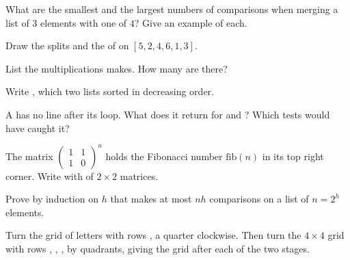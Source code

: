 \begin{exercise}[$\star$]\label{exo:g12:divide-and-conquer:2}
What are the smallest and the largest numbers of comparisons when merging a list of $3$ elements with one of $4$?
Give an example of each.
\end{exercise}

\begin{exercise}[$\star$]\label{exo:g12:divide-and-conquer:3}
Draw the splits and the  of  on $[5, 2, 4, 6, 1, 3]$.
\end{exercise}

\begin{exercise}[$\star$]\label{exo:g12:divide-and-conquer:4}
List the multiplications  makes. How many are there?
\end{exercise}

\begin{exercise}[$\star$]\label{exo:g12:divide-and-conquer:5}
Write , which  two lists sorted in decreasing order.
\end{exercise}

\begin{exercise}[$\star\star$]\label{exo:g12:divide-and-conquer:6}
A  has no line after its loop. What does it return for \code{[1, 4, 9]} and \code{[2, 3]}? Which tests
would have caught it?
\end{exercise}

\begin{exercise}[$\star\star$]\label{exo:g12:divide-and-conquer:7}
The matrix $\begin{pmatrix} 1 & 1 \\ 1 & 0 \end{pmatrix}^n$ holds the Fibonacci number $\mathrm{fib}(n)$ in its top
right corner. Write  with  of $2 \times 2$ matrices.
\end{exercise}

\begin{exercise}[$\star\star$]\label{exo:g12:divide-and-conquer:8}
Prove by induction on $h$ that  makes at most $n h$ comparisons on a list of $n = 2^h$ elements.
\end{exercise}

\begin{exercise}[$\star\star$]\label{exo:g12:divide-and-conquer:9}
Turn the grid of letters with rows ,  a quarter clockwise. Then turn the $4 \times 4$ grid with rows
, , ,  by quadrants, giving the grid after each of the two stages.
\end{exercise}

